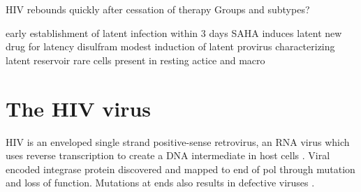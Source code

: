 \documentclass[../sherrill-Mix_thesis.tex]{subfiles}
\begin{document}

	HIV rebounds quickly after cessation of therapy \citep{Cillo2014}
	Groups and subtypes?

	early establishment of latent infection \citep{Chun1998a} within 3 days \citep{Whitney2014}
	SAHA induces latent \citep{Contreras2009}
	new drug for latency disulfram \citep{Xing2011}
	modest induction of latent provirus \citep{Cillo2014}
	characterizing latent reservoir rare cells present in resting actice and macro \citep{Chun1997}


	





\section{The HIV virus}
	HIV is an enveloped single strand positive-sense retrovirus, an RNA virus which uses reverse transcription to create a DNA intermediate in host cells \citep{Baltimore1970,Temin1970}. Viral encoded integrase protein discovered \citep{Grandgenett1978} and mapped to \threePrime{} end of pol \citep{Panganiban1984,Schwartzberg1984,Donehower1984} through mutation and loss of function.  Mutations at ends also results in defective viruses \citep{Panganiban1983}.
\end{document}

